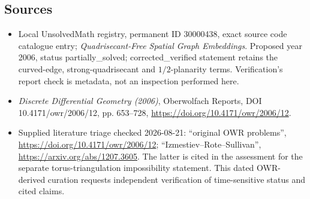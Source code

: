 \documentclass[11pt]{article}
\begin{document}
\subsection{Sources}
\begin{itemize}
\item Local UnsolvedMath registry, permanent ID 30000438, exact source code catalogue entry; \emph{Quadrisecant-Free Spatial Graph Embeddings}. Proposed year 2006, status partially\_solved; corrected\_verified statement retains the curved-edge, strong-quadrisecant and $1/2$-planarity terms. Verification's report check is metadata, not an inspection performed here.
\item \emph{Discrete Differential Geometry (2006)}, Oberwolfach Reports, DOI 10.4171/owr/2006/12, pp. 653--728, \url{https://doi.org/10.4171/owr/2006/12}.
\item Supplied literature triage checked 2026-08-21: ``original OWR problems'', \url{https://doi.org/10.4171/owr/2006/12}; ``Izmestiev--Rote--Sullivan'', \url{https://arxiv.org/abs/1207.3605}. The latter is cited in the assessment for the separate torus-triangulation impossibility statement. This dated OWR-derived curation requests independent verification of time-sensitive status and cited claims.
\end{itemize}
\end{document}
